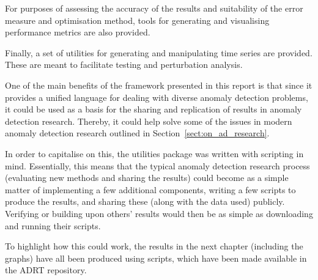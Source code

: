For purposes of assessing the accuracy of the results and suitability of the error measure and optimisation method, tools for generating and visualising performance metrics are also provided.

Finally, a set of utilities for generating and manipulating time series are provided. These are meant to facilitate testing and perturbation analysis.

One of the main benefits of the framework presented in this report is that since it provides a unified language for dealing with diverse anomaly detection problems, it could be used as a basis for the sharing and replication of results in anomaly detection research. Thereby, it could help solve some of the issues in modern anomaly detection research outlined in Section~\ref{sect:on_ad_research}.

In order to capitalise on this, the utilities package was written with scripting in mind. Essentially, this means that the typical anomaly detection research process (evaluating new methods and sharing the results) could become as a simple matter of implementing a few additional components, writing a few scripts to produce the results, and sharing these (along with the data used) publicly. Verifying or building upon others' results would then be as simple as downloading and running their scripts.

To highlight how this could work, the results in the next chapter (including the graphs) have all been produced using scripts, which have been made available in the ADRT repository.

